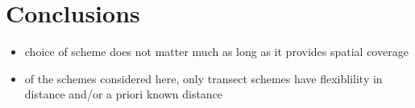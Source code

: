 \documentclass[review]{elsarticle}
\begin{document}
\section{Conclusions}

\begin{itemize}
\item choice of scheme does not matter much as long as it provides spatial
coverage

\item of the schemes considered here, only transect schemes have flexiblility
in distance and/or a priori known distance
\end{itemize}








\end{document}
